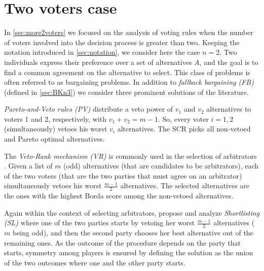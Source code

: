 \documentclass[version=3.21, pagesize, twoside=off, bibliography=totoc, DIV=calc, fontsize=12pt, a4paper]{scrartcl}
\begin{document}

\section{Two voters case}
In \cref{sec:more2voters} we focused on the analysis of voting rules when the number of voters involved into the decision process is greater than two. Keeping the notation introduced in \cref{sec:notation}, we consider here the case $n=2$. Two individuals express their preference over a set of alternatives $A$, and the goal is to find a common agreement on the alternative to select. This class of problems is often referred to as bargaining problems. In addition to \textit{fallback bargaining (FB)} \citep{Brams2001} (defined in \cref{sec:BKn3}) we consider three prominent solutions of the literature.

\textit{Pareto-and-Veto rules (PV)} \citep{Laslier2020} distribute a veto power of $v_1$ and $v_2$ alternatives to voters 1 and 2, respectively, with $v_1+v_2=m-1$. So, every voter $i=1,2$ (simultaneously) vetoes his worst $v_i$ alternatives. The \ac{SCR} picks all non-vetoed and Pareto optimal alternatives.

The \textit{Veto-Rank mechanism (VR)} is commonly used in the selection of arbitrators \citep{Clippel2014}. Given a list of $m$ (odd) alternatives (that are candidates to be arbitrators), each of the two voters (that are the two parties that must agree on an arbitrator) simultaneously vetoes his worst $\frac{m-1}{2}$ alternatives. The selected alternatives are the ones with the highest Borda score among the non-vetoed alternatives.

Again within the context of selecting arbitrators, \citet{Clippel2014} propose and analyze \textit{Shortlisting (SL)} where one of the two parties starts by vetoing her worst $\frac{m-1}{2}$ alternatives ($m$ being odd), and then the second party chooses her best alternative out of the remaining ones. As the outcome of the procedure depends on the party that starts, symmetry among players is ensured by defining the solution as the union of the two outcomes where one and the other party starts.
\end{document}
